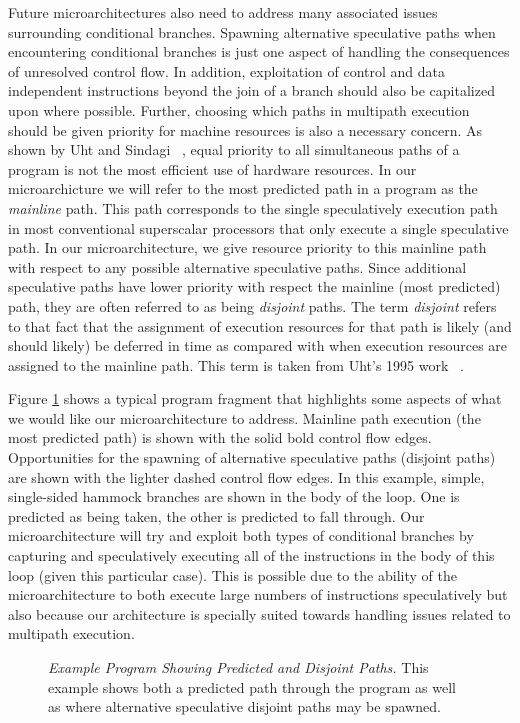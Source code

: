 \documentclass[10pt,dvips]{article}
\begin{document}
Future microarchitectures also need to 
address many associated issues surrounding conditional branches.
Spawning alternative speculative paths when encountering conditional
branches is just one aspect of handling the consequences of
unresolved control flow.
In addition, exploitation
of control
and data independent instructions beyond the join of a branch should
also be capitalized upon where possible.
Further, choosing which paths in multipath execution should
be given priority for machine resources is also a necessary concern.
As shown by Uht and Sindagi ~\cite{Uht95},
equal priority to all simultaneous paths
of a program is not the most efficient use of hardware resources.
In our microarchicture we will refer to the most predicted path
in a program as the 
\textit{mainline} path.  
This path corresponds to the single speculatively
execution path in most conventional superscalar processors that only
execute a single speculative path.  In our microarchitecture,
we give resource priority to this mainline path with respect
to any possible alternative speculative paths.  
Since additional speculative paths have lower priority with
respect the mainline (most predicted) path, they are often referred
to as being
\textit{disjoint} paths.  
The term \textit{disjoint} refers to that fact that the assignment
of execution resources for that path is likely (and should likely) be
deferred in time
as compared with when execution resources are assigned to the mainline
path.
This term is taken from Uht's 
1995 work ~\cite{Uht95}.

Figure \ref{fig:disjoint} shows a typical program fragment that
highlights some aspects of what we would like our microarchitecture
to address.
Mainline path execution (the most predicted path) is shown with the
solid bold control flow edges.  Opportunities for the spawning of alternative
speculative paths (disjoint paths) are shown with the lighter dashed
control flow edges.  In this example, simple, single-sided hammock 
branches are shown in the body of the loop.  One is predicted as
being taken, the other is predicted to fall through.  Our microarchitecture
will try and exploit both types of conditional branches by capturing
and speculatively executing
all of the instructions in the body of this loop (given this particular
case).  This is possible due to the ability of the microarchitecture to
both execute large numbers of instructions speculatively but also
because our architecture is specially suited towards handling
issues related to multipath execution.

\begin{figure}
\centering
{}
\caption{{\em Example Program Showing Predicted and Disjoint
Paths.} 
This example shows both a predicted path through the program as
well as where alternative speculative disjoint paths may be
spawned.}
\label{fig:disjoint}
\end{figure}
\end{document}

